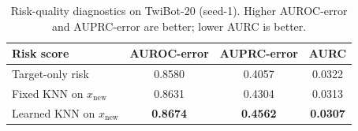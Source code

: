 \begin{table}[t]
\caption{Risk-quality diagnostics on TwiBot-20 (seed-1). Higher AUROC-error and AUPRC-error are better; lower AURC is better.}
\label{tab:risk-quality}
\centering
\small
\setlength{\tabcolsep}{4pt}
\begin{tabular}{lccc}
\toprule
Risk score & AUROC-error & AUPRC-error & AURC \\
\midrule
Target-only risk & 0.8580 & 0.4057 & 0.0322 \\
Fixed KNN on $x_{\mathrm{new}}$ & 0.8631 & 0.4304 & 0.0313 \\
Learned KNN on $x_{\mathrm{new}}$ & \textbf{0.8674} & \textbf{0.4562} & \textbf{0.0307} \\
\bottomrule
\end{tabular}
\end{table}
